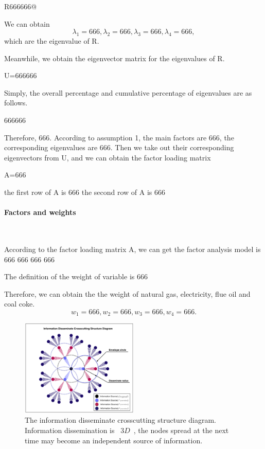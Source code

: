 \documentclass[a4paper,11pt]{article}
\begin{document}
R666666@

\par We can obtain 
\[
\lambda_1=666, \lambda_2=666, \lambda_3=666, \lambda_4=666,
\]
which are the eigenvalue of R.
\par Meanwhile, we obtain the eigenvector matrix for the eigenvalues of R.

U=666666

\par Simply, the overall percentage and cumulative percentage of eigenvalues are as follows.

666666

\par Therefore, 666. According to assumption 1, the main factors are 666, the corresponding eigenvalues are 666. Then we take out their corresponding eigenvectors from U, and we can obtain the factor loading matrix

A=666

the first row of A is 
666
the second row of A is
666

\paragraph{Factors and weights}
\textrm{\\}
\par According to the factor loading matrix A, we can get the factor analysis model is
666
666
666
666

The definition of the weight of variable is
666\cite{5}

Therefore, we can obtain the the weight of natural gas, electricity, flue oil and coal coke.
\[
w_1=666, w_2=666, w_3=666, w_4=666.
\]
\begin{figure}[h]%
    \centering 
    \includegraphics[width=0.5\textwidth]{./Pic/Information_Disseminate_Crosscutting_Structure_Diagram.png}
    \caption{The information disseminate crosscutting structure diagram. Information dissemination is ~$3D$~, the nodes spread at the next time may become an independent source of information.}
    \label{fig:Information_Disseminate_Crosscutting_Structure_Diagram}  
\end{figure}
\end{document}
